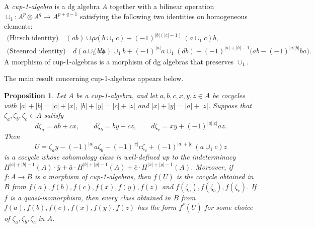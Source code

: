 \documentclass[11pt]{article}
\newtheorem{proposition}[theorem]{Proposition}
\theoremstyle{definition}
\theoremstyle{definition}
\begin{document}
\smallskip


A \emph{cup-1-algebra} is a dg algebra $A$ together with a bilinear operation 
$\cup_1\colon A^p\otimes A^q\to A^{p+q-1}$ satisfying the following two identities on homogeneous elements:
\begin{align*} 
\textrm{(Hirsch identity)} 
\quad (ab) \cup_1 c &= a(b \cup_1 c) + (-1)^{|b|(|c| - 1)} \, (a \cup_1 c)b,\\ 
\textrm{(Steenrod identity)} \quad d(a \cup_1 b) &= (da)\cup_1 b +(-1)^{|a|} a\cup_1(db)
+(-1)^{|a|+|b|-1}\bigl(ab -(-1)^{|a||b|}ba\bigr). 
\end{align*} 
A morphism of cup-1-algebras is a morphism of dg algebras that preserves $\cup_1$.

\smallskip

The main result concerning cup-1-algebras appears below. 


\begin{proposition}
\label{prop: cup1prod}
Let $A$ be a cup-1-algebra,
and let $a,b,c,x,y,z\in A$ be cocycles with $|a|+|b|=|c|+|x|$, $|b|+|y|=|c|+|z|$ and $|x|+|y|=|a|+|z|$.
Suppose that $\zeta_a,\zeta_b,\zeta_c\in A$ satisfy 
\begin{equation*}
d\zeta_a=ab+cx, \qquad d\zeta_b=by-cz, \qquad d\zeta_c=xy+(-1)^{|a||c|}az.
\end{equation*} 
Then
\begin{equation*}
U = \zeta_ay-(-1)^{|a|}a\zeta_b -(-1)^{|c|} c\zeta_c +(-1)^{|a|+|c|}\left(a\cup_1 c\right)z 
\end{equation*} 
is a cocycle whose cohomology class is well-defined up to the indeterminacy 
$H^{|a|+|b|-1}(A)\cdot\bar y +\bar a\cdot H^{|b|+|y|-1}(A)+\bar c\cdot H^{|x|+|y|-1}(A)$.
Moreover, if $f\colon A\to B$ is a morphism of cup-1-algebras, 
then $f(U)$ is the cocycle obtained in $B$ from $f(a),f(b),f(c),f(x),f(y),f(z)$ 
and $f(\zeta_a),f(\zeta_b),f(\zeta_c)$. 
If $f$ is a quasi-isomorphism, then every class obtained in $B$ from $f(a),f(b),f(c),f(x),f(y),f(z)$
has the form $f^*(\overline{U} )$ for some choice of $\zeta_a,\zeta_b,\zeta_c$ in $A$.
\end{proposition}
\end{document}
